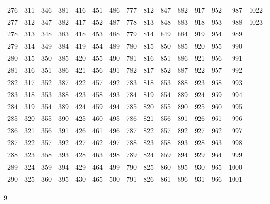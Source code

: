 \documentclass{assignment}
\begin{document}
\begin{tabular}{r r r r r r r r r r r r r r r}
276 & 311 & 346 & 381 & 416 & 451 & 486 & 777 & 812 & 847 & 882 & 917 & 952 & 987 & 1022 \\
277 & 312 & 347 & 382 & 417 & 452 & 487 & 778 & 813 & 848 & 883 & 918 & 953 & 988 & 1023 \\
278 & 313 & 348 & 383 & 418 & 453 & 488 & 779 & 814 & 849 & 884 & 919 & 954 & 989 \\
279 & 314 & 349 & 384 & 419 & 454 & 489 & 780 & 815 & 850 & 885 & 920 & 955 & 990 \\
280 & 315 & 350 & 385 & 420 & 455 & 490 & 781 & 816 & 851 & 886 & 921 & 956 & 991 \\
281 & 316 & 351 & 386 & 421 & 456 & 491 & 782 & 817 & 852 & 887 & 922 & 957 & 992 \\
282 & 317 & 352 & 387 & 422 & 457 & 492 & 783 & 818 & 853 & 888 & 923 & 958 & 993 \\
283 & 318 & 353 & 388 & 423 & 458 & 493 & 784 & 819 & 854 & 889 & 924 & 959 & 994 \\
284 & 319 & 354 & 389 & 424 & 459 & 494 & 785 & 820 & 855 & 890 & 925 & 960 & 995 \\
285 & 320 & 355 & 390 & 425 & 460 & 495 & 786 & 821 & 856 & 891 & 926 & 961 & 996 \\
286 & 321 & 356 & 391 & 426 & 461 & 496 & 787 & 822 & 857 & 892 & 927 & 962 & 997 \\
287 & 322 & 357 & 392 & 427 & 462 & 497 & 788 & 823 & 858 & 893 & 928 & 963 & 998 \\
288 & 323 & 358 & 393 & 428 & 463 & 498 & 789 & 824 & 859 & 894 & 929 & 964 & 999 \\
289 & 324 & 359 & 394 & 429 & 464 & 499 & 790 & 825 & 860 & 895 & 930 & 965 & 1000 \\
290 & 325 & 360 & 395 & 430 & 465 & 500 & 791 & 826 & 861 & 896 & 931 & 966 & 1001 \\
\end{tabular}
\newpage


9\\
\\
\end{document}
